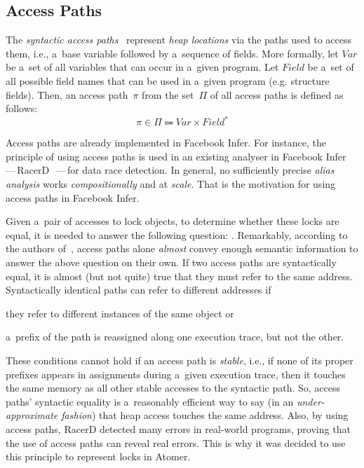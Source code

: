 \subsection{Access Paths}
\label{sec:accessPath}

The \emph{syntactic access paths}~\cite{accessPath} represent \emph{heap
locations} via the paths used to access them, i.e., a~base variable followed
by a~sequence of fields. More formally, let $ Var $ be a~set of all variables
that can occur in a~given program. Let $ Field $ be a~set of all possible
field names that can be used in a~given program (e.g. structure fields). Then,
an access path~$ \pi $ from the set~$ \Pi $ of all access paths is defined
as follows:
$$
    \pi \in \Pi \Coloneqq Var \times Field^*
$$

Access paths are already implemented in Facebook Infer. For instance, the
principle of using access paths is used in an existing analyser in Facebook
Infer\,---\,RacerD~\cite{racerD}\,---\,for data race detection. In general,
no sufficiently precise \emph{alias analysis} works \emph{compositionally}
and at \emph{scale}. That is the motivation for using access paths in
Facebook Infer.

Given a~pair of accesses to lock objects, to determine whether these locks
are equal, it is needed to answer the following question: . Remarkably, according to the authors
of~\cite{racerD}, access paths alone \emph{almost} convey enough semantic
information to answer the above question on their own. If two access paths
are syntactically equal, it is almost (but not quite) true that they must
refer to the same address. Syntactically identical paths can refer to
different addresses if
\begin{enumerate*}[label={(\roman*)}]
    \item
        they refer to different instances of the same object or

    \item
        a~prefix of the path is reassigned along one execution trace,
        but not the other.
\end{enumerate*}
These conditions cannot hold if an access path is \emph{stable}, i.e., if
none of its proper prefixes appears in assignments during a~given
execution trace, then it touches the same memory as all other stable
accesses to the syntactic path. So, access paths' syntactic equality is
a~reasonably efficient way to say (in an \emph{under-approximate fashion})
that heap access touches the same address. Also, by using access paths,
RacerD detected many errors in real-world programs, proving that the
use of access paths can reveal real errors. This is why it was decided to
use this principle to represent locks in Atomer.

